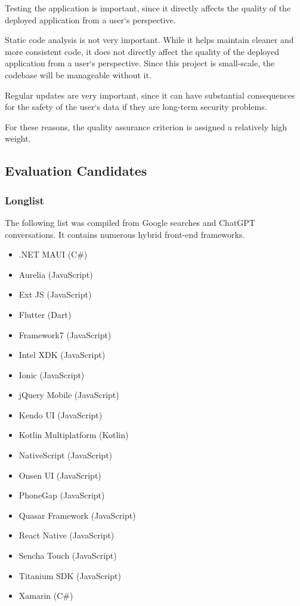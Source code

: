 Testing the application is important, since it directly affects the quality of the deployed application from a user`s perspective.

Static code analysis is not very important.
While it helps maintain cleaner and more consistent code, it does not directly affect the quality of the deployed application from a user`s perspective.
Since this project is small-scale, the codebase will be manageable without it.

Regular updates are very important, since it can have substantial consequences for the safety of the user`s data if they are long-term security problems.

For these reasons, the quality assurance criterion is assigned a relatively high weight.

\subsection{Evaluation Candidates}\label{subsec:candidates}

\subsubsection{Longlist}
The following list was compiled from Google searches and ChatGPT conversations.
It contains numerous hybrid front-end frameworks.

\begin{itemize}
    \item .NET MAUI (C\#)
    \item Aurelia (JavaScript)
    \item Ext JS (JavaScript)
    \item Flutter (Dart)
    \item Framework7 (JavaScript)
    \item Intel XDK (JavaScript)
    \item Ionic (JavaScript)
    \item jQuery Mobile (JavaScript)
    \item Kendo UI (JavaScript)
    \item Kotlin Multiplatform (Kotlin)
    \item NativeScript (JavaScript)
    \item Onsen UI (JavaScript)
    \item PhoneGap (JavaScript)
    \item Quasar Framework (JavaScript)
    \item React Native (JavaScript)
    \item Sencha Touch (JavaScript)
    \item Titanium SDK (JavaScript)
    \item Xamarin (C\#)
\end{itemize}

